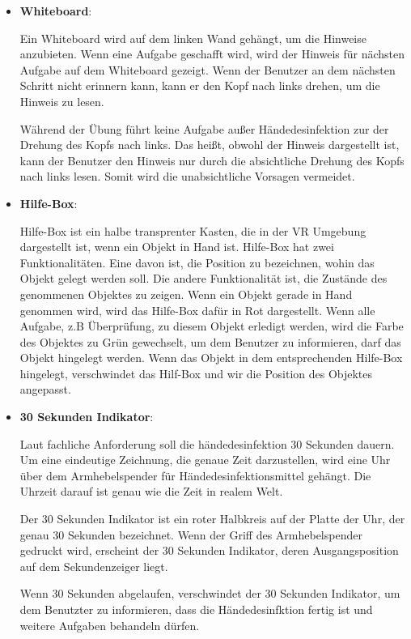   \begin{itemize}
      \item \textbf{Whiteboard}:
      
      Ein Whiteboard wird auf dem linken Wand gehängt, um die Hinweise anzubieten. Wenn eine Aufgabe geschafft wird, wird der Hinweis für nächsten Aufgabe auf dem Whiteboard gezeigt. Wenn der Benutzer an dem nächsten Schritt nicht erinnern kann, kann er den Kopf nach links drehen, um die Hinweis zu lesen.
      
      Während der Übung führt keine Aufgabe außer Händedesinfektion zur der Drehung des Kopfs nach links. Das heißt, obwohl der Hinweis dargestellt ist, kann der Benutzer den Hinweis nur durch die absichtliche Drehung des Kopfs nach links lesen. Somit wird die unabsichtliche Vorsagen vermeidet.
      
      \item \textbf{Hilfe-Box}:
      
      Hilfe-Box ist ein halbe transprenter Kasten, die in der VR Umgebung dargestellt ist, wenn ein Objekt in Hand ist. Hilfe-Box hat zwei Funktionalitäten. Eine davon ist, die Position zu bezeichnen, wohin das Objekt gelegt werden soll. Die andere Funktionalität ist, die Zustände des genommenen Objektes zu zeigen. Wenn ein Objekt gerade in Hand genommen wird, wird das Hilfe-Box dafür in Rot dargestellt. Wenn alle Aufgabe, z.B Überprüfung, zu diesem Objekt erledigt werden,  wird die Farbe des Objektes zu Grün gewechselt, um dem Benutzer zu informieren, darf das Objekt hingelegt werden. Wenn das Objekt in dem entsprechenden Hilfe-Box hingelegt, verschwindet das Hilf-Box und wir die Position des Objektes angepasst.
      
      \item \textbf{30 Sekunden Indikator}:
      
      Laut fachliche Anforderung soll die händedesinfektion 30 Sekunden dauern. Um eine eindeutige Zeichnung, die genaue Zeit darzustellen, wird eine Uhr über dem Armhebelspender für Händedesinfektionsmittel gehängt. Die Uhrzeit darauf ist genau wie die Zeit in realem Welt.
      
      Der 30 Sekunden Indikator ist ein roter Halbkreis auf der Platte der Uhr, der genau 30 Sekunden bezeichnet. Wenn der Griff des Armhebelspender gedruckt wird, erscheint der 30 Sekunden Indikator, deren Ausgangsposition auf dem Sekundenzeiger liegt.
      
      Wenn 30 Sekunden abgelaufen, verschwindet der 30 Sekunden Indikator, um dem Benutzter zu informieren, dass die Händedesinfktion fertig ist und weitere Aufgaben behandeln dürfen.
      

\end{itemize}
